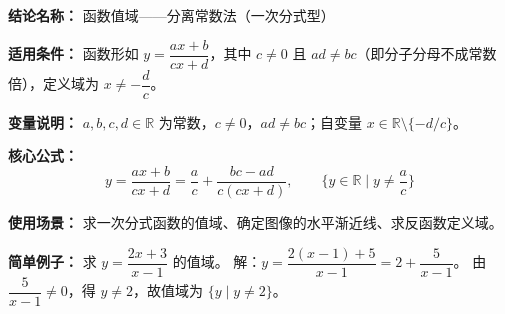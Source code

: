 \textbf{结论名称：} 函数值域——分离常数法（一次分式型）

\textbf{适用条件：} 函数形如 $y=\dfrac{ax+b}{cx+d}$，其中 $c\neq0$ 且 $ad\neq bc$（即分子分母不成常数倍），定义域为 $x\neq -\dfrac{d}{c}$。

\textbf{变量说明：} $a,b,c,d\in\mathbb{R}$ 为常数，$c\neq0$，$ad\neq bc$；自变量 $x\in\mathbb{R}\setminus\{-d/c\}$。

\textbf{核心公式：}
\[
y=\frac{ax+b}{cx+d}=\frac{a}{c}+\frac{bc-ad}{c(cx+d)},\qquad \boxed{\{y\in\mathbb{R}\mid y\neq \frac{a}{c}\}}
\]

\textbf{使用场景：} 求一次分式函数的值域、确定图像的水平渐近线、求反函数定义域。

\textbf{简单例子：} 求 $y=\dfrac{2x+3}{x-1}$ 的值域。  
解：$y=\dfrac{2(x-1)+5}{x-1}=2+\dfrac{5}{x-1}$。  
由 $\dfrac{5}{x-1}\neq0$，得 $y\neq2$，故值域为 $\{y\mid y\neq2\}$。